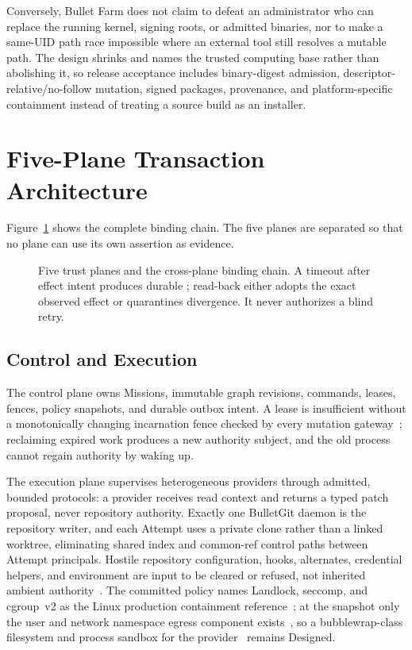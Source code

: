 \documentclass[journal]{IEEEtran}
\newcommand{\Designed}{\textsf{Designed}}
\newcommand{\code}[1]{\texttt{\detokenize{#1}}}
\begin{document}
Conversely, Bullet Farm does not claim to defeat an administrator who can
replace the running kernel, signing roots, or admitted binaries, nor to make a
same-UID path race impossible where an external tool still resolves a mutable
path. The design shrinks and names the trusted computing base rather than
abolishing it, so release acceptance includes binary-digest admission,
descriptor-relative/no-follow mutation, signed packages, provenance, and
platform-specific containment instead of treating a source build as an
installer.

\section{Five-Plane Transaction Architecture}
\label{sec:architecture}

Figure~\ref{fig:architecture} shows the complete binding chain. The five planes are separated so that no plane can use its own assertion as
evidence.

\begin{figure}[!t]
\centering
\resizebox{.97\textwidth}{!}{\BulletArchitectureFigure{\textwidth}}
\caption{Five trust planes and the cross-plane binding chain. A timeout after
effect intent produces durable \code{UNKNOWN}; read-back either adopts the
exact observed effect or quarantines divergence. It never authorizes a blind
retry.}
\label{fig:architecture}
\end{figure}

\subsection{Control and Execution}

The control plane owns Missions, immutable graph revisions, commands, leases,
fences, policy snapshots, and durable outbox intent. A lease is insufficient
without a monotonically changing incarnation fence checked by every mutation
gateway~\cite{kleppmann2016,bulletClosure}; reclaiming expired work produces a
new authority subject, and the old process cannot regain authority by waking
up.

The execution plane supervises heterogeneous providers through admitted,
bounded protocols: a provider receives read context and returns a typed patch
proposal, never repository authority. Exactly one BulletGit daemon is the
repository writer, and each Attempt uses a private clone rather than a linked
worktree, eliminating shared index and common-ref control paths between
Attempt principals. Hostile repository configuration, hooks, alternates,
credential helpers, and environment are input to be cleared or refused, not
inherited ambient authority~\cite{bulletGitArch}. The committed
policy names Landlock, seccomp, and cgroup~v2 as the Linux production
containment reference~\cite{bulletPolicy,landlock,seccomp}; at the snapshot
only the user and network namespace egress component
exists~\cite{namespaces7,bulletRelease}, so a bubblewrap-class filesystem and
process sandbox for the provider~\cite{bubblewrap} remains \Designed.
\end{document}
